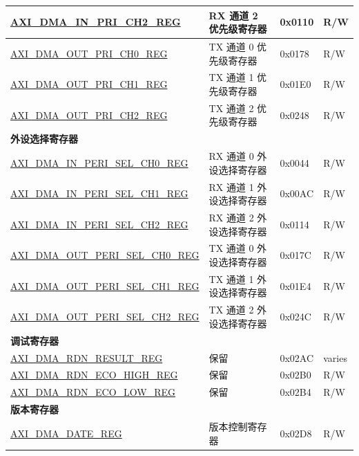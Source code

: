 \begin{longtable}{ | l | l | p{1.3cm} | l | }
\hyperref[regdesc:AXIDMAINPRICHNREG]{AXI\_DMA\_IN\_PRI\_CH2\_REG} & RX 通道 2 优先级寄存器 & 0x0110 & R/W \\ \hline
\hyperref[regdesc:AXIDMAOUTPRICHNREG]{AXI\_DMA\_OUT\_PRI\_CH0\_REG} & TX 通道 0 优先级寄存器 & 0x0178 & R/W \\ \hline
\hyperref[regdesc:AXIDMAOUTPRICHNREG]{AXI\_DMA\_OUT\_PRI\_CH1\_REG} & TX 通道 1 优先级寄存器 & 0x01E0 & R/W \\ \hline
\hyperref[regdesc:AXIDMAOUTPRICHNREG]{AXI\_DMA\_OUT\_PRI\_CH2\_REG} & TX 通道 2 优先级寄存器 & 0x0248 & R/W \\ \hline
\multicolumn{4}{|l|}{\textbf{外设选择寄存器}} \\ \hline
\hyperref[regdesc:AXIDMAINPERISELCHNREG]{AXI\_DMA\_IN\_PERI\_SEL\_CH0\_REG} & RX 通道 0 外设选择寄存器 & 0x0044 & R/W \\ \hline
\hyperref[regdesc:AXIDMAINPERISELCHNREG]{AXI\_DMA\_IN\_PERI\_SEL\_CH1\_REG} & RX 通道 1 外设选择寄存器 & 0x00AC & R/W \\ \hline
\hyperref[regdesc:AXIDMAINPERISELCHNREG]{AXI\_DMA\_IN\_PERI\_SEL\_CH2\_REG} & RX 通道 2 外设选择寄存器 & 0x0114 & R/W \\ \hline
\hyperref[regdesc:AXIDMAOUTPERISELCHNREG]{AXI\_DMA\_OUT\_PERI\_SEL\_CH0\_REG} & TX 通道 0 外设选择寄存器 & 0x017C & R/W \\ \hline
\hyperref[regdesc:AXIDMAOUTPERISELCHNREG]{AXI\_DMA\_OUT\_PERI\_SEL\_CH1\_REG} & TX 通道 1 外设选择寄存器 & 0x01E4 & R/W \\ \hline
\hyperref[regdesc:AXIDMAOUTPERISELCHNREG]{AXI\_DMA\_OUT\_PERI\_SEL\_CH2\_REG} & TX 通道 2 外设选择寄存器 & 0x024C & R/W \\ \hline
\multicolumn{4}{|l|}{\textbf{调试寄存器}} \\ \hline
\hyperref[regdesc:AXIDMARDNRESULTREG]{AXI\_DMA\_RDN\_RESULT\_REG} & 保留 & 0x02AC & varies \\ \hline
\hyperref[regdesc:AXIDMARDNECOHIGHREG]{AXI\_DMA\_RDN\_ECO\_HIGH\_REG} & 保留 & 0x02B0 & R/W \\ \hline
\hyperref[regdesc:AXIDMARDNECOLOWREG]{AXI\_DMA\_RDN\_ECO\_LOW\_REG} & 保留 & 0x02B4 & R/W \\ \hline
\multicolumn{4}{|l|}{\textbf{版本寄存器}} \\ \hline
\hyperref[regdesc:AXIDMADATEREG]{AXI\_DMA\_DATE\_REG} & 版本控制寄存器 & 0x02D8 & R/W \\ \hline
\end{longtable}
